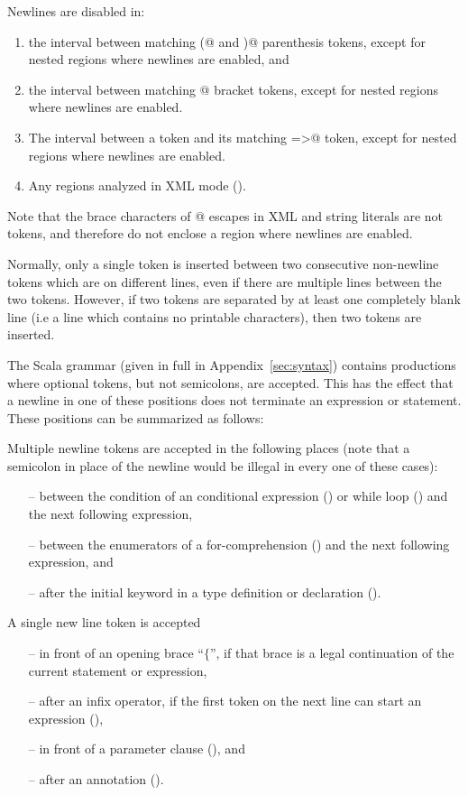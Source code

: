 Newlines are disabled in:
\begin{enumerate}
\item
the interval between matching \lstinline@(@ and \lstinline@)@ parenthesis tokens, except for nested regions where newlines are enabled, and
\item
the interval between matching @ bracket tokens,
except for nested regions where newlines are enabled.
\item
The interval between a \lstinline@case@ token and its matching
\lstinline@=>@ token, except for nested regions where newlines are
enabled.
\item Any regions analyzed in XML mode ().
\end{enumerate}
Note that the brace characters of @ escapes in XML and
string literals are not tokens, 
and therefore do not enclose a region where newlines
are enabled.

Normally, only a single  token is inserted between two
consecutive non-newline tokens which are on different lines, even if there are multiple lines
between the two tokens. However, if two tokens are separated by at
least one completely blank line (i.e a line which contains no
printable characters), then two  tokens are inserted.

The Scala grammar (given in full in Appendix~\ref{sec:syntax})
contains productions where optional  tokens, but not
semicolons, are accepted. This has the effect that a newline in one of these
positions does not terminate an expression or statement. These positions can
be summarized as follows:

Multiple newline tokens are accepted in the following places (note
that a semicolon in place of the newline would be illegal in every one
of these cases):
\begin{itemize}
\item[--]
between the condition of an conditional expression
() or while loop () and the next
following expression,
\item[--]
between the enumerators of a for-comprehension ()
and the next following expression, and
\item[--]
after the initial \lstinline@type@ keyword in a type definition or
declaration ().
\end{itemize}
A single new line token is accepted
\begin{itemize}
\item[--] 
  in front of an opening brace ``$\{$'', if that brace is a legal
  continuation of the current statement or expression,
\item[--]
  after an infix operator, if the first token on the next line can
  start an expression (),
\item[--]
  in front of a parameter clause (), and
\item[--]
  after an annotation ().
\end{itemize}  

